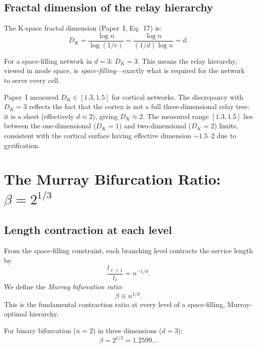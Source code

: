 \documentclass[aps,pre,twocolumn,superscriptaddress,longbibliography]{revtex4-2}
\begin{document}
\subsection{Fractal dimension of the relay hierarchy}

The K-space fractal dimension (Paper~I, Eq.~17) is:
\begin{equation}
  D_K = \frac{\log n}{\log(1/c)} = \frac{\log n}{(1/d)\log n} = d.
  \label{eq:DK}
\end{equation}

For a space-filling network in $d = 3$: $D_K = 3$.
This means the relay hierarchy, viewed in mode space,
is \emph{space-filling}---exactly what is required for
the network to serve every cell.

Paper~I measured $D_K \in [1.3, 1.5]$ for cortical networks.
The discrepancy with $D_K = 3$ reflects the fact that
the cortex is not a full three-dimensional relay tree:
it is a sheet (effectively $d \approx 2$), giving
$D_K \approx 2$.
The measured range $[1.3, 1.5]$ lies between the
one-dimensional ($D_K = 1$) and two-dimensional
($D_K = 2$) limits, consistent with the cortical surface
having effective dimension $\sim 1.5$--$2$ due to
gyrification.


\section{The Murray Bifurcation Ratio: $\beta = 2^{1/3}$}
\label{sec:beta}

\subsection{Length contraction at each level}

From the space-filling constraint, each branching level
contracts the service length by
\begin{equation}
  \frac{l_{\ell+1}}{l_\ell} = n^{-1/d}.
  \label{eq:length-ratio}
\end{equation}
We define the \emph{Murray bifurcation ratio}:
\begin{equation}
  \boxed{\beta \equiv n^{1/d}.}
  \label{eq:beta-def}
\end{equation}
This is the fundamental contraction ratio at every level
of a space-filling, Murray-optimal hierarchy.

For binary bifurcation ($n = 2$) in three dimensions ($d = 3$):
\begin{equation}
  \beta = 2^{1/3} = 1.2599\ldots
  \label{eq:beta-value}
\end{equation}
\end{document}
